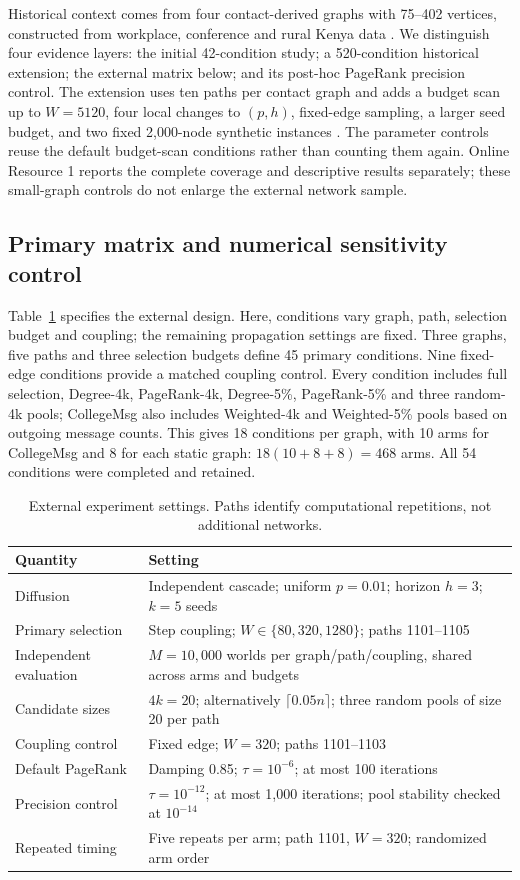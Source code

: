 \documentclass[smallextended]{svjour3}
\begin{document}
Historical context comes from four contact-derived graphs with 75--402 vertices, constructed from workplace, conference and rural Kenya data \cite{ref3,ref4,ref5,ref6}. We distinguish four evidence layers: the initial 42-condition study; a 520-condition historical extension; the external matrix below; and its post-hoc PageRank precision control. The extension uses ten paths per contact graph and adds a budget scan up to $W=5120$, four local changes to $(p,h)$, fixed-edge sampling, a larger seed budget, and two fixed 2,000-node synthetic instances \cite{ref17,ref18}. The parameter controls reuse the default budget-scan conditions rather than counting them again. Online Resource 1 reports the complete coverage and descriptive results separately; these small-graph controls do not enlarge the external network sample.

\subsection{Primary matrix and numerical sensitivity control}
Table~\ref{tab:settings} specifies the external design. Here, conditions vary graph, path, selection budget and coupling; the remaining propagation settings are fixed. Three graphs, five paths and three selection budgets define 45 primary conditions. Nine fixed-edge conditions provide a matched coupling control. Every condition includes full selection, Degree-4k, PageRank-4k, Degree-5\%, PageRank-5\% and three random-4k pools; CollegeMsg also includes Weighted-4k and Weighted-5\% pools based on outgoing message counts. This gives 18 conditions per graph, with 10 arms for CollegeMsg and 8 for each static graph: $18(10+8+8)=468$ arms. All 54 conditions were completed and retained.

\begin{table}[htbp]
\caption{External experiment settings. Paths identify computational repetitions, not additional networks.}\label{tab:settings}
\begin{tabularx}{\linewidth}{lX}
\toprule
Quantity & Setting \\
\midrule
Diffusion & Independent cascade; uniform $p=0.01$; horizon $h=3$; $k=5$ seeds \\
Primary selection & Step coupling; $W\in\{80,320,1280\}$; paths 1101--1105 \\
Independent evaluation & $M=10,000$ worlds per graph/path/coupling, shared across arms and budgets \\
Candidate sizes & $4k=20$; alternatively $\lceil0.05n\rceil$; three random pools of size 20 per path \\
Coupling control & Fixed edge; $W=320$; paths 1101--1103 \\
Default PageRank & Damping 0.85; $\tau=10^{-6}$; at most 100 iterations \\
Precision control & $\tau=10^{-12}$; at most 1,000 iterations; pool stability checked at $10^{-14}$ \\
Repeated timing & Five repeats per arm; path 1101, $W=320$; randomized arm order \\
\bottomrule
\end{tabularx}
\end{table}
\end{document}
